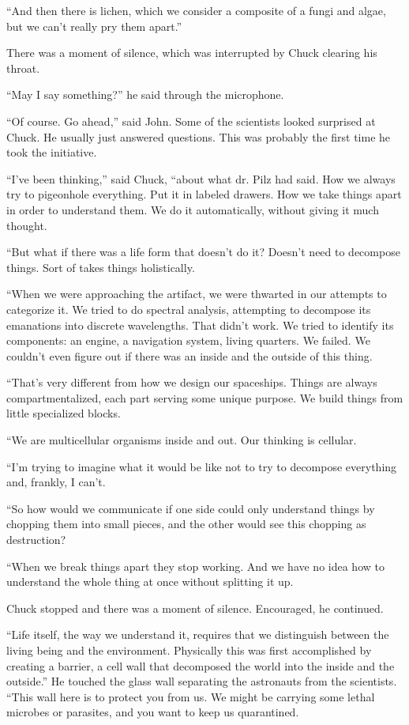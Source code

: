 \documentclass[12pt]{book}
\begin{document}
``And then there is lichen, which we consider a composite of a fungi and algae, but we can't really pry them apart.''

There was a moment of silence, which was interrupted by Chuck clearing his throat.

``May I say something?'' he said through the microphone.

``Of course. Go ahead,'' said John. Some of the scientists looked surprised at Chuck. He usually just answered questions. This was probably the first time he took the initiative.

``I've been thinking,'' said Chuck, ``about what dr. Pilz had said. How we always try to pigeonhole everything. Put it in labeled drawers. How we take things apart in order to understand them. We do it automatically, without giving it much thought.

``But what if there was a life form that doesn't do it? Doesn't need to decompose things. Sort of takes things holistically.

``When we were approaching the artifact, we were thwarted in our attempts to categorize it. We tried to do spectral analysis, attempting to decompose its emanations into discrete wavelengths. That didn't work. We tried to identify its components: an engine, a navigation system, living quarters. We failed. We couldn't even figure out if there was an inside and the outside of this thing.

``That's very different from how we design our spaceships. Things are always compartmentalized, each part serving some unique purpose. We build things from little specialized blocks. 

``We are multicellular organisms inside and out. Our thinking is cellular. 

``I'm trying to imagine what it would be like not to try to decompose everything and, frankly, I can't. 

``So how would we communicate if one side could only understand things by chopping them into small pieces, and the other would see this chopping as destruction?

``When we break things apart they stop working. And we have no idea how to understand the whole thing at once without splitting it up.

Chuck stopped and there was a moment of silence. Encouraged, he continued.

``Life itself, the way we understand it, requires that we distinguish between the living being and the environment. Physically this was first accomplished by creating a barrier, a cell wall that decomposed the world into the inside and the outside.'' He touched the glass wall separating the astronauts from the scientists. ``This wall here is to protect you from us. We might be carrying some lethal microbes or parasites, and you want to keep us quarantined.
\end{document}
